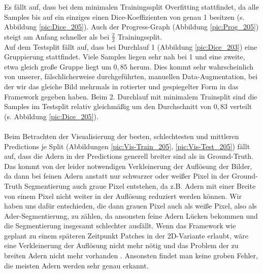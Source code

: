 Es fällt auf, dass bei dem minimalen Trainingssplit Overfitting stattfindet, da alle Samples bis auf ein einziges einen Dice-Koeffizienten von genau 1 besitzen (s. Abbildung \ref{pic:Dice_205}). Auch der Progress-Graph (Abbildung \ref{pic:Prog_205}) steigt am Anfang schneller als bei $\frac{2}{3}$ Trainingssplit.\\
Auf dem Testsplit fällt auf, dass bei Durchlauf 1 (Abbildung \ref{pic:Dice_203}) eine Gruppierung stattfindet. Viele Samples liegen sehr nah bei 1 und eine zweite, etwa gleich große Gruppe liegt um $0,85$ herum. Dies kommt sehr wahrscheinlich von unserer, fälschlicherweise durchgeführten, manuellen Data-Augmentation, bei der wir das gleiche Bild mehrmals in rotierter und gespiegelter Form in das Framework gegeben haben. Beim 2. Durchlauf mit minimalem Trainsplit sind die Samples im Testsplit relativ gleichmäßig um den Durchschnitt von $0,83$ verteilt (s. Abbildung \ref{pic:Dice_205}).\\\\
Beim Betrachten der Visualisierung der besten, schlechtesten und mittleren Predictions je Split (Abbildungen \ref{pic:Vis-Train_205}, \ref{pic:Vis-Test_205}) fällt auf, dass die Adern in der Predictions generell breiter sind als in Ground-Truth. Das kommt von der leider notwendigen Verkleinerung der Auflösung der Bilder, da dann bei feinen Adern anstatt nur schwarzer oder weißer Pixel in der Ground-Truth Segmentierung auch graue Pixel entstehen, da z.B. Adern mit einer Breite von einem Pixel nicht weiter in der Auflösung reduziert werden können. Wir haben uns dafür entschieden, die dann grauen Pixel auch als weiße Pixel, also als Ader-Segmentierung, zu zählen, da ansonsten feine Adern Lücken bekommen und die Segmentierung insgesamt schlechter ausfällt. Wenn das Framework wie geplant zu einem späteren Zeitpunkt Patches in der 2D-Variante erlaubt, wäre eine Verkleinerung der Auflösung nicht mehr nötig und das Problem der zu breiten Adern nicht mehr vorhanden \cite{nnunetGithub-2dpatches}.
Ansonsten findet man keine groben Fehler, die meisten Adern werden sehr genau erkannt. 




